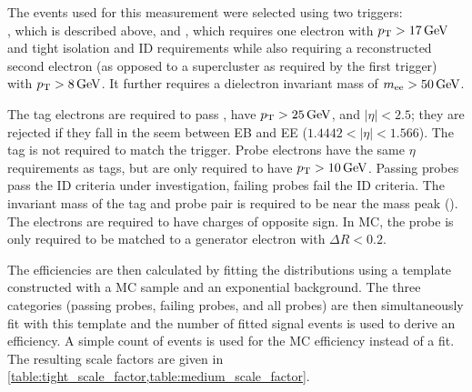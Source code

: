 The events used for this measurement were selected using two triggers: \\
\TnPTrigger, which is described above, and \TnPTriggerSecond, which requires
one electron with $\pt > \SI{17}{\GeV}$ and tight isolation and ID requirements
while also requiring a reconstructed second electron (as opposed to a
supercluster as required by the first trigger) with $\pt > \SI{8}{\GeV}$. It
further requires a dielectron invariant mass of $\mee > \SI{50}{\GeV}$.

The tag electrons are required to pass \EGTIGHT, have $\pt > \SI{25}{\GeV}$,
and $|\eta| < 2.5$; they are rejected if they fall in the seem between EB and
EE ($1.4442 < |\eta| < 1.566$). The tag is not required to match the trigger.
Probe electrons have the same $\eta$ requirements as tags, but are only
required to have $\pt > \SI{10}{\GeV}$. Passing probes pass the ID criteria
under investigation, failing probes fail the ID criteria. The invariant mass of
the tag and probe pair is required to be near the \Z mass peak (\MassRange).
The electrons are required to have charges of opposite sign. In MC, the probe
is only required to be matched to a generator electron with $\Delta R < 0.2$.

The efficiencies are then calculated by fitting the \mee distributions using a
template constructed with a \Ztoee MC sample and an exponential background. The
three categories (passing probes, failing probes, and all probes) are then
simultaneously fit with this template and the number of fitted signal events is
used to derive an efficiency. A simple count of events is used for the MC
efficiency instead of a fit. The resulting scale factors are given in
\cref{table:tight_scale_factor,table:medium_scale_factor}.




